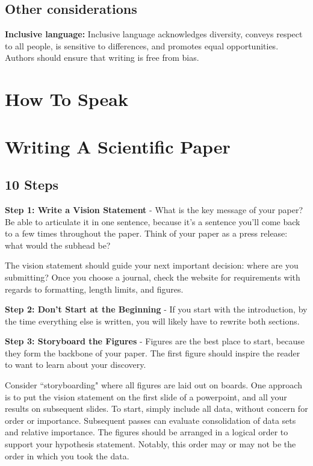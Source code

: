 \subsection{Other considerations}


\textbf{Inclusive language:} Inclusive language acknowledges diversity, conveys respect to all people, is sensitive to differences, and promotes equal opportunities. Authors should ensure that writing is free from bias.




\section{How To Speak}


\section{Writing A Scientific Paper}

\subsection{10 Steps}

\textbf{Step 1: Write a Vision Statement} - What is the key message of your paper? Be able to articulate it in one sentence, because it's a sentence you'll come back to a few times throughout the paper. Think of your paper as a press release: what would the subhead be? 

The vision statement should guide your next important decision: where are you submitting? Once you choose a journal, check the website for requirements with regards to formatting, length limits, and figures.


\textbf{Step 2: Don't Start at the Beginning} - If you start with the introduction, by the time everything else is written, you will likely have to rewrite both sections.


\textbf{Step 3: Storyboard the Figures} - Figures are the best place to start, because they form the backbone of your paper. The first figure should inspire the reader to want to learn about your discovery.

Consider ``storyboarding" where all figures are laid out on boards. One approach is to put the vision statement on the first slide of a powerpoint, and all your results on subsequent slides. To start, simply include all data, without concern for order or importance. Subsequent passes can evaluate consolidation of data sets and relative importance. The figures should be arranged in a logical order to support your hypothesis statement. Notably, this order may or may not be the order in which you took the data.


